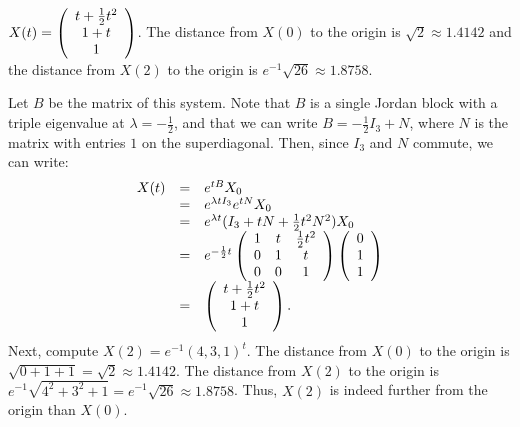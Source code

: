   \ans $X(t) = \left(\begin{array}{c} t + \frac{1}{2}t^2 \\ 1 + t \\ 1\end{array}\right)$. The distance from $X(0)$ to the 
origin is $\sqrt{2} \approx 1.4142$ and the distance from $X(2)$ to the origin is
$e^{-1}\sqrt{26} \approx 1.8758$.

\soln Let $B$ be the matrix of this system.  Note that $B$ is a single Jordan block
with a triple eigenvalue at $\lambda = -\frac{1}{2}$, and that we can write
$B = -\frac{1}{2}I_3 + N$, where $N$ is the matrix with entries $1$ on the
superdiagonal.  Then, since $I_3$ and $N$ commute, we can write:
\[
\begin{array}{rcl}
X(t) & = & e^{tB}X_0 \\
& = & e^{\lambda tI_3}e^{tN}X_0 \\
& = & e^{\lambda t}(I_3 + tN + \frac{1}{2}t^2N^2)X_0 \\
& = & e^{-\frac{1}{2} t}\left(\begin{array}{ccc} 1 & t & \frac{1}{2}t^2 \\ 0 & 1 & t \\ 0 & 0 & 1\end{array}\right)
\left(\begin{array}{r} 0 \\ 1 \\ 1\end{array}\right) \\
& = & \left(\begin{array}{c} t + \frac{1}{2}t^2 \\ 1 + t \\ 1\end{array}\right).
\end{array}
\]
Next, compute $X(2) = e^{-1}(4,3,1)^t$.
The distance from $X(0)$ to the origin is $\sqrt{0 + 1 + 1} = \sqrt{2}
\approx 1.4142$.  The distance from $X(2)$ to the origin is
$e^{-1}\sqrt{4^2 + 3^2 + 1} = e^{-1}\sqrt{26} \approx 1.8758$.
Thus, $X(2)$ is indeed further from the origin than $X(0)$.

